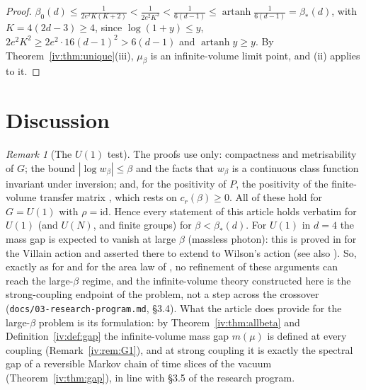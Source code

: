 \documentclass[11pt,a4paper]{article}
\theoremstyle{definition}
\theoremstyle{remark}
\newtheorem{remark}[theorem]{Remark}
\DeclareMathOperator{\artanh}{artanh}
\newcommand{\Flab}[2]{\cite[#1 \texttt{#2}]{F}}
\newcommand{\IIIref}[3]{\cite[#1~`#2' (\texttt{#3})]{III}}
\newcommand{\bS}{\beta_*}
\begin{document}
\begin{proof}
$\beta_0(d)\le\frac1{2e^2K(K+2)}<\frac1{2e^2K^2}<\frac1{6(d-1)}\le\artanh\frac1{6(d-1)}=\bS(d)$, with $K=4(2d-3)\ge4$, since
$\log(1+y)\le y$, $2e^2K^2\ge2e^2\cdot16(d-1)^2>6(d-1)$ and $\artanh y\ge y$. By Theorem~\ref{iv:thm:unique}(iii), $\mu_\beta$ is an
infinite-volume limit point, and \IIIref{Corollary}{String tension}{al:cor:tension}(ii) applies to it.
\end{proof}

\section{Discussion}\label{iv:sec:discussion}

\begin{remark}[The $U(1)$ test]\label{iv:rem:u1}
The proofs use only: compactness and metrisability of $G$; the bound $|\log w_\beta|\le\beta$ and the facts that $w_\beta$ is a
continuous class function invariant under inversion; and, for the positivity of $P$, the positivity of the finite-volume transfer
matrix \Flab{Lemma}{lem:K}, which rests on $c_r(\beta)\ge0$. All of these hold for $G=U(1)$ with $\rho=\mathrm{id}$. Hence every
statement of this article holds verbatim for $U(1)$ (and $U(N)$, and finite groups) for $\beta<\bS(d)$. For $U(1)$ in $d=4$ the
mass gap is expected to vanish at large $\beta$ (massless photon): this is proved in \cite{FS82} for the Villain action and asserted
there to extend to Wilson's action (see also \cite{Gut80}). So, exactly as for \Flab{Theorem}{thm:strong} and
for the area law of \cite{III}, no refinement of these arguments can reach the large-$\beta$ regime, and the infinite-volume theory
constructed here is the strong-coupling endpoint of the problem, not a step across the crossover
(\texttt{docs/03-research-program.md}, \S3.4). What the article does provide for the large-$\beta$ problem is its formulation:
by Theorem~\ref{iv:thm:allbeta} and Definition~\ref{iv:def:gap} the infinite-volume mass gap $m(\mu)$ is defined at every coupling
(Remark~\ref{iv:rem:G1}), and at strong coupling it is exactly the spectral gap of a reversible Markov chain of time slices of the vacuum
(Theorem~\ref{iv:thm:gap}), in line with \S3.5 of the research program.
\end{remark}
\end{document}
